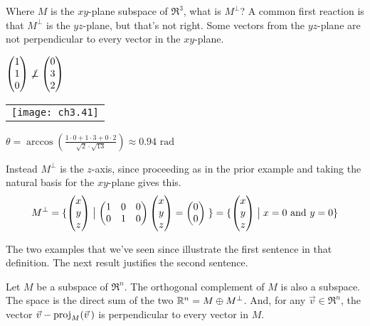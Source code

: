 \begin{example} \label{ex:OrthoCompTwo}
Where \( M \) is the \( xy \)-plane subspace of \( \Re^3 \),
what is \( M^\perp \)?
A common first reaction is that \( M^\perp \) is the \( yz \)-plane, but
that's not right.
Some vectors from the \( yz \)-plane are not perpendicular to every
vector in the \( xy \)-plane.
\begin{center}  \small
    {\small $\colvec{1 \\ 1 \\ 0} \not\perp \colvec{0 \\ 3 \\ 2}$}
   \quad
  \begin{tabular}{@{}c@{}}\texttt{[image: ch3.41]}\end{tabular}
   \quad
   {\small $\displaystyle 
       \theta=\arccos(\frac{1\cdot 0+1\cdot 3+0\cdot 2}{
                            \sqrt{2}\cdot\sqrt{13}})
    \approx\text{$0.94$~rad}$}
\end{center}
Instead \( M^\perp \) is the \( z \)-axis, since proceeding as in the
prior example and taking the natural basis for the $xy$-plane gives this.
\begin{equation*}
  M^\perp
  =
  \set{\colvec{x \\ y \\ z}\suchthat \begin{pmatrix}
                                         1  &0  &0  \\
                                         0  &1  &0
                                       \end{pmatrix}
                                       \colvec{x \\ y \\ z}=
                                       \colvec{0 \\ 0} \;}
  =
  \set{\colvec{x \\ y \\ z}\suchthat x=0 \text{\ and\ }y=0  }
\end{equation*}
\end{example}

The two examples that we've seen since 
illustrate the first sentence in that definition.
The next result justifies the second sentence.

\begin{lemma} \label{le:OrthoProjWellDefd}
Let $M$ be a subspace of $\Re^n$.
The orthogonal complement of $M$ is also a subspace.
The space is the direct sum of the two \( \Re^n=M\directsum M^\perp \).
And, for any $\vec{v}\in\Re^n$,
the vector $\vec{v}-\proj{\vec{v}\,}{M}$ is perpendicular to every
vector in $M$. 
\end{lemma}

